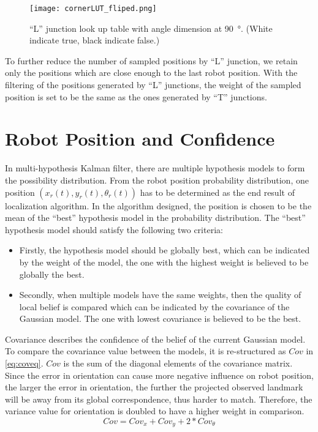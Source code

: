 \begin{figure}
\begin{center}
	\texttt{[image: cornerLUT\_fliped.png]}
\end{center}
\caption{``L'' junction look up table with angle dimension at \SI{90}{\degree}. (White indicate true, black indicate false.)}
\label{fig:lcornerLUT}
\end{figure}

To further reduce the number of sampled positions by ``L'' junction, we retain only the positions which are close enough to the last robot position. With the filtering of the positions generated by ``L'' junctions, the weight of the sampled position is set to be the same as the ones generated by ``T'' junctions.

\section{Robot Position and Confidence}\label{sec:robotpose}
In multi-hypothesis Kalman filter, there are multiple hypothesis models to form the possibility distribution. From the robot position probability distribution, one position $(x_{r}(t), y_{r}(t),\theta_{r}(t))$
has to be determined as the end result of localization algorithm. In the algorithm designed, the position is chosen to be the mean of the ``best'' hypothesis model in the probability distribution. The  ``best'' hypothesis model should satisfy the following two criteria:
\begin{itemize}
  \item Firstly, the hypothesis model should be globally best, which can be indicated by the weight of the model, the one with the highest weight is believed to be globally the best.
   \item Secondly, when multiple models have the same weights, then the quality of local belief is compared which can be indicated by the covariance of the Gaussian model. The one with lowest covariance is believed to be the best.
\end{itemize}

Covariance describes the confidence of the belief of the current Gaussian model. To compare the covariance value between the models, it is re-structured as $Cov$ in \autoref{eq:coveq}. $Cov$ is the sum of the diagonal elements of the covariance matrix. Since the error in orientation can cause more negative influence on robot position, \ie the larger the error in orientation, the further the projected observed landmark will be away from its global correspondence, thus harder to match. Therefore, the variance value for orientation is doubled to have a higher weight in comparison.
\begin{equation}
\label{eq:coveq}
Cov = Cov_x + Cov_y +2*Cov_{\theta}
\end{equation}

